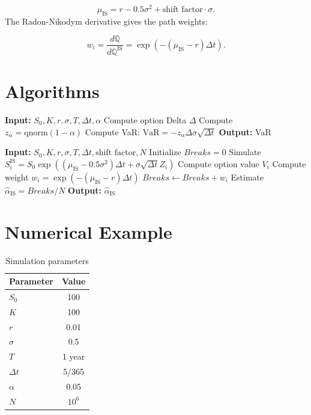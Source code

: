 \documentclass[11pt,a4paper]{article}
\begin{document}
\begin{equation}
\mu_{\text{IS}} = r - 0.5\sigma^2 + \text{shift factor} \cdot \sigma.
\end{equation}
The Radon-Nikodym derivative gives the path weights:

\begin{equation}
w_i = \frac{d\mathbb{Q}}{d\mathbb{Q}^{\text{IS}}} = \exp(-( \mu_{\text{IS}} - r)\Delta t).
\end{equation}

\section{Algorithms}

\begin{algorithm}[H]
\caption{Delta-Normal VaR Estimation}
\begin{algorithmic}[1]
\State \textbf{Input:} $S_0,K,r,\sigma,T,\Delta t,\alpha$
\State Compute option Delta $\Delta$
\State Compute $z_\alpha = \text{qnorm}(1-\alpha)$
\State Compute VaR: $\text{VaR} = - z_\alpha \Delta \sigma \sqrt{\Delta t}$
\State \textbf{Output:} VaR
\end{algorithmic}
\end{algorithm}

\begin{algorithm}[H]
\caption{Importance Sampling for VaR Breaks}
\begin{algorithmic}[1]
\State \textbf{Input:} $S_0,K,r,\sigma,T,\Delta t,\text{shift factor},N$
\State Initialize $Breaks = 0$
    \State Simulate $S_i^{\text{IS}} = S_0 \exp((\mu_{\text{IS}}-0.5\sigma^2)\Delta t + \sigma \sqrt{\Delta t} Z_i)$
    \State Compute option value $V_i$
    \State Compute weight $w_i = \exp(-( \mu_{\text{IS}} - r)\Delta t)$
        \State $Breaks \gets Breaks + w_i$
    \EndIf
\EndFor
\State Estimate $\hat{\alpha}_{\text{IS}} = Breaks / N$
\State \textbf{Output:} $\hat{\alpha}_{\text{IS}}$
\end{algorithmic}
\end{algorithm}

\section{Numerical Example}
\begin{table}[h!]
\centering
\begin{tabular}{lc}
\toprule
Parameter & Value \\
\midrule
$S_0$ & 100 \\
$K$ & 100 \\
$r$ & 0.01 \\
$\sigma$ & 0.5 \\
$T$ & 1 year \\
$\Delta t$ & 5/365 \\
$\alpha$ & 0.05 \\
$N$ & $10^6$ \\
\bottomrule
\end{tabular}
\caption{Simulation parameters}
\end{table}
\end{document}
